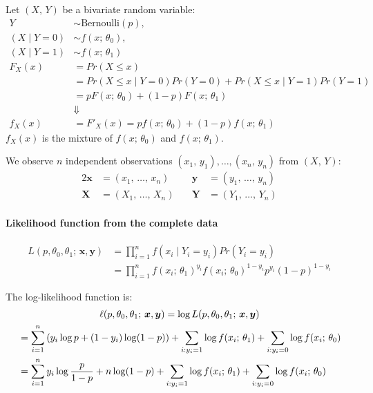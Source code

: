 Let $(X,\,Y)$ be a bivariate random variable:
\begin{align*}
	Y               & \sim \text{Bernoulli}(p),                                               \\
	( X \mid Y = 0) & \sim f(x;\,\theta_0),                                                   \\
	( X \mid Y = 1) & \sim f(x;\,\theta_1)                                                    \\[0.5em]
	F_X(x)          & = Pr(X \leq x)                                                          \\
	                & = Pr(X \leq x \mid Y = 0) Pr(Y = 0) + Pr(X \leq x \mid Y = 1) Pr(Y = 1) \\
	                & = p F(x;\,\theta_0) + (1-p) F(x;\,\theta_1)                             \\
	                & \Downarrow                                                              \\
	f_X(x)          & = F'_X(x) = p f(x;\,\theta_0) + (1-p) f(x;\,\theta_1)
\end{align*}
$f_X(x)$ is the mixture of $f(x;\,\theta_0)$ and $f(x;\,\theta_1)$.

We observe $n$ independent observations $(x_1,\,y_1),\dots,(x_n,\,y_n)$ from $(X,\,Y)$:
\begin{alignat*}{2}
	\boldsymbol{x} & = (x_1,\,\dots,\,x_n)       & \boldsymbol{y} & = (y_1,\,\dots,\,y_n) \\
	\boldsymbol{X} & = (X_1,\,\dots,\,X_n) \quad & \boldsymbol{Y} & = (Y_1,\,\dots,\,Y_n)
\end{alignat*}

\paragraph{Likelihood function from the complete data}
\begin{align*}
	L(p,\theta_0,\theta_1;\,\boldsymbol{x},\boldsymbol{y})
	 & = \prod_{i=1}^n f(x_i \mid Y_i = y_i) Pr(Y_i = y_i)                                       \\
	 & = \prod_{i=1}^n f(x_i;\, \theta_1)^{y_i} f(x_i;\, \theta_0)^{1-y_i} p^{y_i} (1-p)^{1-y_i}
\end{align*}

The log-likelihood function is:
\begin{align*}
	\span \ell(p,\theta_0,\theta_1;\,\boldsymbol{x},\boldsymbol{y})
	= \log L(p,\theta_0,\theta_1;\,\boldsymbol{x},\boldsymbol{y})       \\
	 & = \sum_{i=1}^n \left( y_i \log p + (1 - y_i) \log(1 - p) \right)
	+ \sum_{i:y_i=1} \log f(x_i;\,\theta_1)
	+ \sum_{i:y_i=0} \log f(x_i;\,\theta_0)                             \\
	 & = \sum_{i=1}^n y_i \log \frac{p}{1-p} + n \log (1 - p)
	+ \sum_{i:y_i=1} \log f(x_i;\,\theta_1)
	+ \sum_{i:y_i=0} \log f(x_i;\,\theta_0)
\end{align*}

